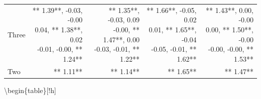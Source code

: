 \documentclass[12pt,PhD,twoside,openright]{muthesis}
\begin{document}
\begin{table}[!h]
\begin{tabular}[t]{l>{\ttfamily}r>{\ttfamily}r>{\ttfamily}r>{\ttfamily}r}
\hspace{1em}Three & \makecell[l]{** 1.39**, -0.03, -0.00\\  0.04, ** 1.38**,  0.02\\ -0.01, -0.00, ** 1.24**} & \makecell[l]{** 1.35**, -0.03,  0.09\\ -0.00, ** 1.47**,  0.00\\ -0.03, -0.01, ** 1.22**} & \makecell[l]{** 1.66**, -0.05,  0.02\\  0.01, ** 1.65**, -0.04\\ -0.05, -0.01, ** 1.62**} & \makecell[l]{** 1.43**,  0.00, -0.00\\  0.00, ** 1.50**, -0.00\\ -0.00, -0.00, ** 1.53**}\\
\rowcolor{gray!6}  \hspace{1em}Two & ** 1.11** & ** 1.14** & ** 1.65** & ** 1.47**\\
\bottomrule
\end{tabular}
\end{table}
\textbackslash begin\{table\}{[}!h{]}
\end{document}
